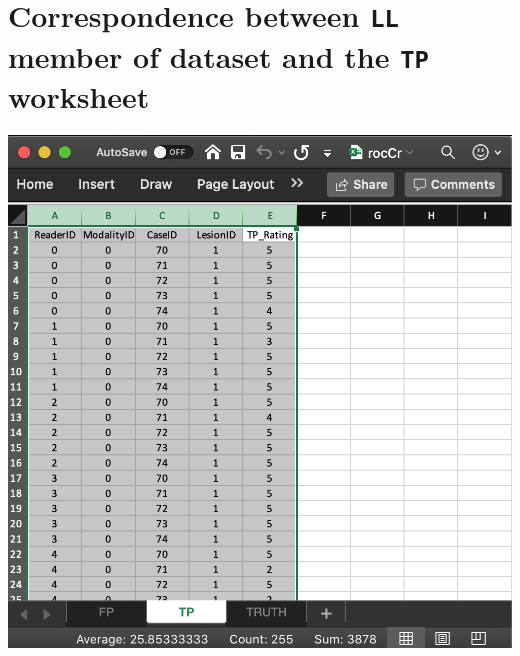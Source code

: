 \documentclass[
]{book}
\begin{document}
\hypertarget{quick-start-read-datafile-correspondence-ll-tp}{%
\section{\texorpdfstring{Correspondence between \texttt{LL} member of dataset and the \texttt{TP} worksheet}{Correspondence between LL member of dataset and the TP worksheet}}\label{quick-start-read-datafile-correspondence-ll-tp}}

\includegraphics[width=1\textwidth,height=\textheight]{images/quick-start/rocCrTp.png}
\end{document}
